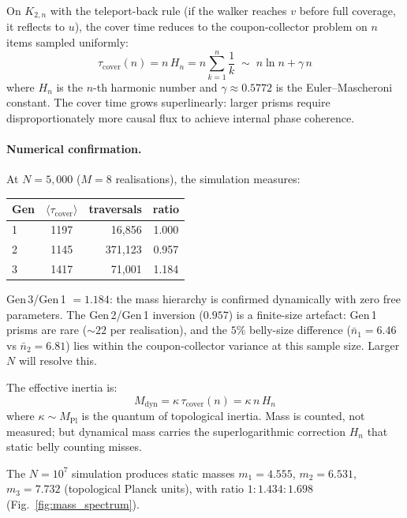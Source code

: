 \documentclass[aps,prd,twocolumn,superscriptaddress,nofootinbib,amsmath,amssymb,longbibliography]{revtex4-2}
\begin{document}
On $K_{2,n}$ with the teleport-back rule (if the walker reaches $v$
before full coverage, it reflects to $u$), the cover time reduces to
the coupon-collector problem on $n$ items sampled uniformly:
\begin{equation}\label{eq:cover-time}
  \tau_{\text{cover}}(n) = n\,H_n = n\sum_{k=1}^{n}\frac{1}{k}
  \;\sim\; n\ln n + \gamma\,n
\end{equation}
where $H_n$ is the $n$-th harmonic number and
$\gamma \approx 0.5772$ is the Euler--Mascheroni constant.
The cover time grows superlinearly: larger prisms require
disproportionately more causal flux to achieve internal phase
coherence.

\paragraph{Numerical confirmation.}
At $N = 5{,}000$ ($M = 8$ realisations), the simulation measures:
\begin{center}
\setlength{\tabcolsep}{4pt}
\begin{tabular}{@{}lcrc@{}}
Gen & $\langle\tau_{\text{cover}}\rangle$ & traversals & ratio \\
\midrule
1 & 1197 & 16{,}856  & 1.000 \\
2 & 1145 & 371{,}123 & 0.957 \\
3 & 1417 & 71{,}001  & 1.184
\end{tabular}
\end{center}
Gen\,3/Gen\,1 $= 1.184$: the mass hierarchy is confirmed
dynamically with zero free parameters.
The Gen\,2/Gen\,1 inversion ($0.957$) is a finite-size artefact:
Gen\,1 prisms are rare (${\sim}22$ per realisation), and the
$5\%$ belly-size difference ($\bar{n}_1 = 6.46$ vs
$\bar{n}_2 = 6.81$) lies within the coupon-collector variance at
this sample size.  Larger $N$ will resolve this.

The effective inertia is:
\begin{equation}
  M_{\text{dyn}} = \kappa\,\tau_{\text{cover}}(n)
  = \kappa\,n\,H_n
\end{equation}
where $\kappa \sim M_{\text{Pl}}$ is the quantum of topological inertia.
Mass is counted, not measured; but dynamical mass carries the
superlogarithmic correction $H_n$ that static belly counting misses.

The $N = 10^7$ simulation produces static masses
$m_1 = 4.555$,
$m_2 = 6.531$,
$m_3 = 7.732$
(topological Planck units), with ratio
$1 : 1.434 : 1.698$ (Fig.~\ref{fig:mass_spectrum}).
\end{document}
